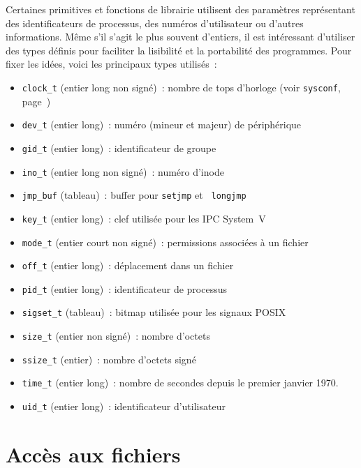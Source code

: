 \documentclass [twoside] {report}
\begin{document}
Certaines primitives et fonctions de librairie utilisent des paramètres
représentant des identificateurs de processus, des numéros d'utilisateur
ou d'autres informations.  Même s'il s'agit le plus souvent d'entiers,
il est intéressant d'utiliser des types définis pour faciliter la
lisibilité et la portabilité des programmes. Pour fixer les idées, voici
les principaux types utilisés~:

\begin {itemize}
    \item {\tt clock\_t} (entier long non signé)~: nombre de tops
	d'horloge (voir {\tt sysconf}, page~\pageref {sysconf})
    \item {\tt dev\_t} (entier long)~: numéro (mineur et majeur) de
	périphérique
    \item {\tt gid\_t} (entier long)~: identificateur de groupe
    \item {\tt ino\_t} (entier long non signé)~: numéro d'inode
    \item {\tt jmp\_buf} (tableau)~: buffer pour {\tt setjmp} et {\tt
	longjmp}
    \item {\tt key\_t} (entier long)~: clef utilisée pour les IPC System~V
    \item {\tt mode\_t} (entier court non signé)~: permissions associées
	à un fichier
    \item {\tt off\_t} (entier long)~: déplacement dans un fichier
    \item {\tt pid\_t} (entier long)~: identificateur de processus
    \item {\tt sigset\_t} (tableau)~: bitmap utilisée pour les signaux POSIX
    \item {\tt size\_t} (entier non signé)~: nombre d'octets
    \item {\tt ssize\_t} (entier)~: nombre d'octets signé
    \item {\tt time\_t} (entier long)~: nombre de secondes
	depuis le premier janvier 1970.
    \item {\tt uid\_t} (entier long)~: identificateur d'utilisateur
\end {itemize}




\section {Accès aux fichiers}
\end{document}
